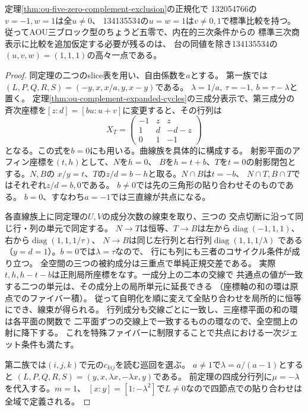 \begin{proposition}[五零の補集合二族と共点への退化]
\label{prop:ou-five-zero-cycle-pencils}
定理\ref{thm:ou-five-zero-complement-exclusion}の正規化で
132054766の$v=-1,w=1$は全$u\ne0$、
134135534の$u=w=1$は$v\ne0,1$で標準比較を持つ。
従ってAOU三ブロック型のちょうど五零で、内在的三次条件からの
標準三次商表示に比較を追加仮定する必要が残るのは、
台の同値を除き134135534の$(u,v,w)=(1,1,1)$の高々一点である。
\end{proposition}
\begin{proof}
同定理の二つのslice表を用い、自由係数を$a$とする。
第一族では$(L,P,Q,R,S)=(-y,x,x/a,y,x-y)$である。
$\lambda=1/a,\ \tau=-1,\ b=\tau-\lambda$と置く。
定理\ref{thm:ou-complement-expanded-cycles}の三成分表示で、第三成分の
斉次座標を$[z:d]=[bu:u+v]$に変更すると、その行列は
\[
 X_T=\begin{pmatrix}-1&z&z\\1&d&-d-z\\0&1&-1\end{pmatrix}
\]
となる。この式を$b=0$にも用いる。曲線族を具体的に構成する。
射影平面のアフィン座標を$(t,h)$として、$N$を$h=0$、
$B$を$h=t+b$、$T$を$t=0$の射影閉包とする。$N,B$の
$x/y=t$、$T$の$z/d=b-h$と取る。$N\cap B$は$t=-b$、
$N\cap T,B\cap T$ではそれぞれ$z/d=b,0$である。
$b\ne0$では先の三角形の貼り合わせそのものである。
$b=0$、すなわち$a=-1$では三直線が共点になる。

各直線族上に同定理の$U,V$の成分次数の線束を取り、三つの
交点切断に沿って同じ行・列の単元で同定する。
$N\to T$は恒等、$T\to B$は左から$\operatorname{diag}(-1,1,1)$、
右から$\operatorname{diag}(1,1,1/\tau)$、
$N\to B$は同じ左行列と右行列$\operatorname{diag}(1,1,1/\lambda)$
である（$y=d=1$）。$b=0$では$\lambda=\tau$なので、
行にも列にも三者のコサイクル条件が成り立つ。
全空間の三つの被約成分は三重点で単純正規交差である。
実際$t,h,h-t-b$は正則局所座標をなす。一成分上の二本の交線で
共通点の値が一致する二つの単元は、その成分上の局所単元に延長できる
（座標軸の和の環は原点でのファイバー積）。
従って自明化を順に変えて全貼り合わせを局所的に恒等にでき、線束が得られる。
行列成分も交線ごとに一致し、三座標平面の和の環は各平面の関数で
二平面ずつの交線上で一致するものの環なので、全空間上の射に降下する。
これを特殊ファイバーに制限することで共点における一次ジェット条件も満たす。

第二族では$(i,j,k)$で元の$c_{kij}$を読む巡回を選ぶ。
$a\ne1$で$\lambda=a/(a-1)$とすると
$(L,P,Q,R,S)=(y,x,\lambda x,-\lambda x,y)$である。
前定理の四成分行列に$\mu=-\lambda$を代入する。$m=1$、
$[x:y]=[1:-\lambda^2]$で$L\ne0$なので四節点での貼り合わせは全域で定義される。


\end{proof}
